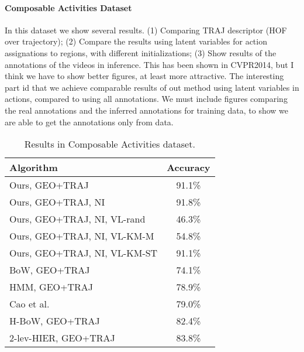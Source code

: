 \paragraph{Composable Activities Dataset} In this dataset we show several results. (1) Comparing TRAJ descriptor (HOF over trajectory); (2) Compare the results using latent variables for action assignations to regions, with different initializations; (3) Show results of the annotations of the videos in inference. This has been shown in CVPR2014, but I think we have to show better figures, at least more attractive. The interesting part id that we achieve comparable results of out method using latent variables in actions, compared to using all annotations. We must include figures comparing the real annotations and the inferred annotations for training data, to show we are able to get the annotations only from data.

\begin{table}
\centering
\begin{tabular}{|l|c|}
\hline
\textbf{Algorithm} & \textbf{Accuracy}\\
\hline
Ours, GEO+TRAJ &  91.1\% \\
Ours, GEO+TRAJ, NI  & 91.8\% \\
Ours, GEO+TRAJ, NI, VL-rand   & 46.3\% \\
Ours, GEO+TRAJ, NI, VL-KM-M   & 54.8\% \\
Ours, GEO+TRAJ, NI, VL-KM-ST   & 91.1\% \\
\hline
BoW, GEO+TRAJ & 74.1\%    \\
HMM, GEO+TRAJ & 78.9\%  \\
Cao et al. \cite{cao2015spatio} & 79.0\% \\
H-BoW, GEO+TRAJ & 82.4\%   \\
2-lev-HIER, GEO+TRAJ & 83.8\%  \\
\hline
\end{tabular}
\caption{Results in Composable Activities dataset. }
\end{table}

